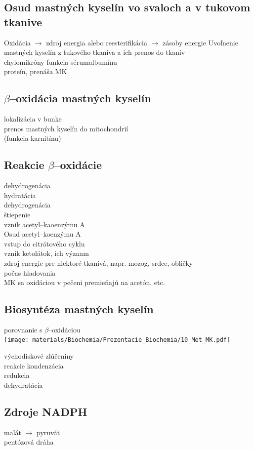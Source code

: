 \subsection*{Osud mastných kyselín vo svaloch a v tukovom tkanive}
Oxidácia $\rightarrow$ zdroj energia alebo reesterifikácia $\rightarrow$ zásoby energie
Uvoľnenie mastných kyselín z tukového tkaniva a ich prenos do tkanív\\
\tab chylomikróny
funkcia sérumalbumínu\\
\tab proteín, prenáša MK
\subsection*{$\beta$--oxidácia mastných kyselín}
lokalizácia v bunke\\
prenos mastných kyselín do mitochondrií\\
\tab (funkcia karnitínu)\\
\subsection*{Reakcie $\beta$--oxidácie}
dehydrogenácia\\
hydratácia\\
dehydrogenácia\\
štiepenie\\
vznik acetyl--kaoenzýmu A\\
Osud acetyl--koenzýmu A\\
\tab vstup do citrátového cyklu\\
vznik ketolátok, ich význam\\
\tab zdroj energie pre niektoré tkanivá, napr. mozog, srdce, obličky\\
\tab počas hladovania\\
\tab MK sa oxidáciou v pečeni premieňajú na acetón, etc.\\
\subsection*{Biosyntéza mastných kyselín}
porovnanie s $\beta$--oxidáciou\\

\texttt{[image: materials/Biochemia/Prezentacie\_Biochemia/10\_Met\_MK.pdf]}

východiskové zlúčeniny\\
reakcie kondenzácia\\
redukcia\\
dehydratácia\\
\subsection*{Zdroje NADPH}
malát $\rightarrow$ pyruvát\\
pentózová dráha\\
